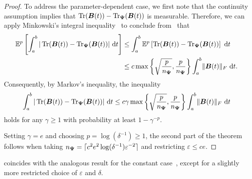 \begin{proof}
    To address the parameter-dependent case, we first note that the continuity assumption implies that $\operatorname{Tr}(\boldsymbol{B}(t)) - \operatorname{Tr}_{\boldsymbol{\Psi}}(\boldsymbol{B}(t))$ is measurable. Therefore, we can apply Minkowski's integral inequality~\cite[Theorem 202]{hardy-1952-inequalities} to conclude from~ that
    \begin{align}
        \mathbb{E}^{p}\left[ \int_{a}^{b} |\operatorname{Tr}(\boldsymbol{B}(t)) - \operatorname{Tr}_{\boldsymbol{\Psi}}(\boldsymbol{B}(t))|~\mathrm{d}t  \right]
        &\leq \int_{a}^{b} \mathbb{E}^{p}\left[ \operatorname{Tr}(\boldsymbol{B}(t)) - \operatorname{Tr}_{\boldsymbol{\Psi}}(\boldsymbol{B}(t)) \right]~\mathrm{d}t \notag \\
        &\leq c \max\left\{ \sqrt{\frac{p}{n_{\boldsymbol{\Psi}}}}, \frac{p}{n_{\boldsymbol{\Psi}}}  \right\} \int_{a}^{b} \lVert \boldsymbol{B}(t) \rVert _F~\mathrm{d}t .
    \end{align}
    Consequently, by Markov's inequality,  the inequality 
    \begin{equation} 
        \int_{a}^{b} |\operatorname{Tr}(\boldsymbol{B}(t)) - \operatorname{Tr}_{\boldsymbol{\Psi}}(\boldsymbol{B}(t))|~\mathrm{d}t \leq c \gamma \max\left\{ \sqrt{\frac{p}{n_{\boldsymbol{\Psi}}}}, \frac{p}{n_{\boldsymbol{\Psi}}}  \right\} \int_{a}^{b} \lVert \boldsymbol{B}(t) \rVert _F~\mathrm{d}t
    \end{equation}
    holds for any $\gamma \geq 1$ with probability at least $1 - \gamma^{-p}$. 

    Setting $\gamma = e$ and choosing $p = \log(\delta^{-1}) \geq 1$, the second part of the theorem follows when taking $n_{\boldsymbol{\Psi}} = \lceil c^2 e^2 \log(\delta^{-1}) \varepsilon^{-2} \rceil$ and restricting $\varepsilon \leq c e$.
\end{proof}

 coincides with the analogous result for the constant case~\cite[Lemma 2.1]{meyer-2021-hutch-optimal}, except for a slightly more restricted choice of $\varepsilon$ and $\delta$.

\color{blue}

